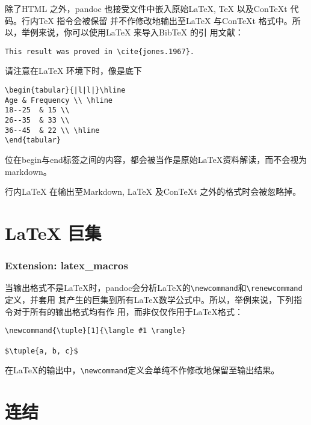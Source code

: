 \documentclass[fancyhdr,bookmark]{ctexbook}
\begin{document}
除了HTML 之外，pandoc 也接受文件中嵌入原始LaTeX, TeX 以及ConTeXt
代码。行内TeX 指令会被保留 并不作修改地输出至LaTeX 与ConTeXt
格式中。所以，举例来说，你可以使用LaTeX 来导入BibTeX 的引 用文献：

\begin{lstlisting}
This result was proved in \cite{jones.1967}.
\end{lstlisting}

请注意在LaTeX 环境下时，像是底下

\begin{lstlisting}
\begin{tabular}{|l|l|}\hline
Age & Frequency \\ \hline
18--25  & 15 \\
26--35  & 33 \\
36--45  & 22 \\ \hline
\end{tabular}
\end{lstlisting}

位在begin与end标签之间的内容，都会被当作是原始LaTeX资料解读，而不会视为markdown。

行内LaTeX 在输出至Markdown, LaTeX 及ConTeXt 之外的格式时会被忽略掉。

\section{LaTeX 巨集}\label{latex-ux5de8ux96c6}

\subsubsection{Extension: latex\_macros}\label{extension-latex_macros}

当输出格式不是LaTeX时，pandoc会分析LaTeX的\lstinline!\newcommand!和\lstinline!\renewcommand!定义，并套用
其产生的巨集到所有LaTeX数学公式中。所以，举例来说，下列指令对于所有的输出格式均有作
用，而非仅仅作用于LaTeX格式：

\begin{lstlisting}
\newcommand{\tuple}[1]{\langle #1 \rangle}

$\tuple{a, b, c}$
\end{lstlisting}

在LaTeX的输出中，\lstinline!\newcommand!定义会单纯不作修改地保留至输出结果。

\section{连结}\label{ux8fdeux7ed3}
\end{document}
